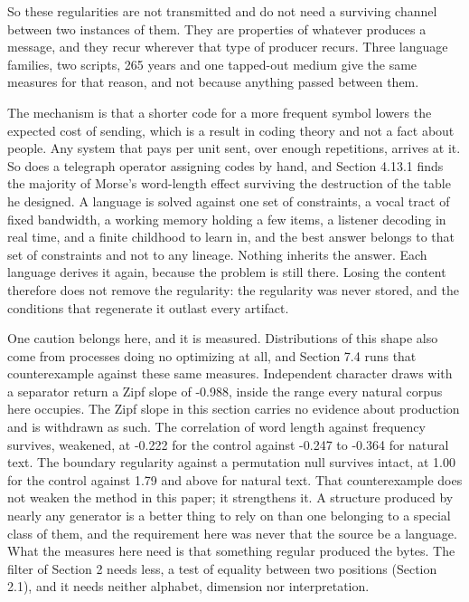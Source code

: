 So these regularities are not transmitted and do not need a surviving channel between two instances of them. They are properties of whatever produces a message, and they recur wherever that type of producer recurs. Three language families, two scripts, 265 years and one tapped-out medium give the same measures for that reason, and not because anything passed between them.

The mechanism is that a shorter code for a more frequent symbol lowers the expected cost of sending, which is a result in coding theory and not a fact about people. Any system that pays per unit sent, over enough repetitions, arrives at it. So does a telegraph operator assigning codes by hand, and Section 4.13.1 finds the majority of Morse's word-length effect surviving the destruction of the table he designed. A language is solved against one set of constraints, a vocal tract of fixed bandwidth, a working memory holding a few items, a listener decoding in real time, and a finite childhood to learn in, and the best answer belongs to that set of constraints and not to any lineage. Nothing inherits the answer. Each language derives it again, because the problem is still there. Losing the content therefore does not remove the regularity: the regularity was never stored, and the conditions that regenerate it outlast every artifact.

One caution belongs here, and it is measured. Distributions of this shape also come from processes doing no optimizing at all, and Section 7.4 runs that counterexample against these same measures. Independent character draws with a separator return a Zipf slope of -0.988, inside the range every natural corpus here occupies. The Zipf slope in this section carries no evidence about production and is withdrawn as such. The correlation of word length against frequency survives, weakened, at -0.222 for the control against -0.247 to -0.364 for natural text. The boundary regularity against a permutation null survives intact, at 1.00 for the control against 1.79 and above for natural text. That counterexample does not weaken the method in this paper; it strengthens it. A structure produced by nearly any generator is a better thing to rely on than one belonging to a special class of them, and the requirement here was never that the source be a language. What the measures here need is that something regular produced the bytes. The filter of Section 2 needs less, a test of equality between two positions (Section 2.1), and it needs neither alphabet, dimension nor interpretation.

